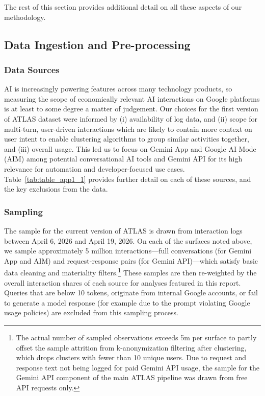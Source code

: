 \documentclass[11pt,a4paper]{article}
\begin{document}
The rest of this section provides additional detail on all these aspects of our methodology.

\subsection{Data Ingestion and Pre-processing}
\label{app:app_1_1}

\subsubsection{Data Sources}

AI is increasingly powering features across many technology products, so measuring the scope of economically relevant AI interactions on Google platforms is at least to some degree a matter of judgement. Our choices for the first version of ATLAS dataset were informed by (i) availability of log data, and (ii) scope for multi-turn, user-driven interactions which are likely to contain more context on user intent to enable clustering algorithms to group similar activities together, and (iii) overall usage. This led us to focus on Gemini App and Google AI Mode (AIM) among potential conversational AI tools and Gemini API for its high relevance for automation and developer-focused use cases. Table~\ref{tab:table_app1_1} provides further detail on each of these sources, and the key exclusions from the data.

\begin{table}[htbp]
    \centering
    \caption{ATLAS Data Sources and Scope}
    \label{tab:table_app1_1}
\small 
\end{table}

\subsubsection{Sampling}
The sample for the current version of ATLAS is drawn from interaction logs between April 6, 2026 and April 19, 2026. On each of the surfaces noted above, we sample approximately 5 million interactions---full conversations (for Gemini App and AIM) and request-response pairs (for Gemini API)---which satisfy basic data cleaning and materiality filters.\footnote{The actual number of sampled observations exceeds 5m per surface to partly offset the sample attrition from k-anonymization filtering after clustering, which drops clusters with fewer than 10 unique users. Due to request and response text not being logged for paid Gemini API usage, the sample for the Gemini API component of the main ATLAS pipeline was drawn from free API requests only.} These samples are then re-weighted by the overall interaction shares of each source for analyses featured in this report. Queries that are below 10 tokens, originate from internal Google accounts, or fail to generate a model response (for example due to the prompt violating Google usage policies) are excluded from this sampling process.
\end{document}
